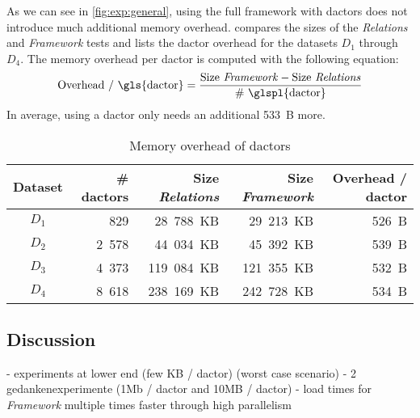   As we can see in \cref{fig:exp:general}, using the full framework with \glspl{dactor} does not introduce much additional memory overhead.
   compares the sizes of the \textit{Relations} and \textit{Framework} tests and lists the \gls{dactor} overhead for the datasets $D_1$ through $D_4$.
  The memory overhead per \gls{dactor} is computed with the following equation:
  \begin{equation}
    \text{Overhead / \gls{dactor}} = \frac{\text{Size \textit{Framework}} - \text{Size \textit{Relations}}}{\text{\# \glspl{dactor}}}
  \end{equation}
  In average, using a \gls{dactor} only needs an additional 533~B more.

  \begin{table}
    \centering
    \begin{tabular}{crrrr}
      \toprule
      \textbf{Dataset} & \textbf{\# \glspl{dactor}} & \textbf{Size \textit{Relations}} & \textbf{Size \textit{Framework}} & \textbf{Overhead / \gls{dactor}}\\
      \midrule
      $D_1$ & 829 & 28~788~KB & 29~213~KB & 526~B \\
      $D_2$ & 2~578 & 44~034~KB & 45~392~KB & 539~B \\
      $D_3$ & 4~373 & 119~084~KB & 121~355~KB & 532~B \\
      $D_4$ & 8~618 & 238~169~KB & 242~728~KB & 534~B \\
      \bottomrule
    \end{tabular}
    \caption{Memory overhead of \glspl{dactor}}
    \label{tab:memory_overhead}
  \end{table}


\subsection{Discussion}\label{sec:exp:discussion}

  - experiments at lower end (few KB / dactor) (worst case scenario)
  - 2 gedankenexperimente (1Mb / dactor and 10MB / dactor)
  - load times for \textit{Framework} multiple times faster through high parallelism